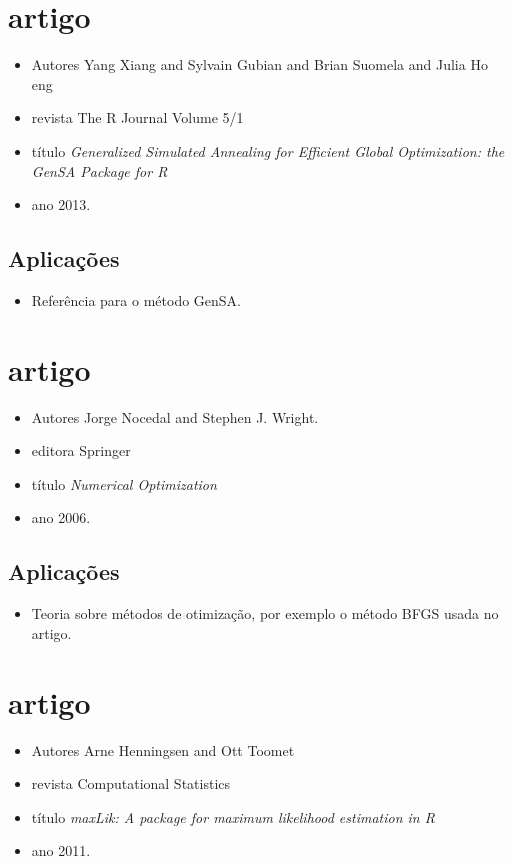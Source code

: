 \documentclass{article}
\begin{document}
\section{artigo \cite{xgsh}}
\begin{itemize}
\item Autores Yang Xiang and Sylvain Gubian and Brian Suomela and
      Julia Ho eng
\item revista The R Journal Volume 5/1
\item título \textit{Generalized Simulated Annealing for Efficient Global
      Optimization: the {GenSA} Package for {R}}
\item ano 2013.
\end{itemize}
\subsection{Aplicações}
\begin{itemize}
\item Referência para o método GenSA.
\end{itemize}
\section{artigo \cite{nw}}
\begin{itemize}
\item Autores Jorge Nocedal and Stephen J. Wright.
\item editora Springer
\item título \textit{Numerical Optimization}
\item ano 2006.
\end{itemize}
\subsection{Aplicações}
\begin{itemize}
\item Teoria sobre métodos de otimização, por exemplo o método BFGS usada no artigo.
\end{itemize}
\section{artigo \cite{ht}}
\begin{itemize}
\item Autores Arne Henningsen and Ott Toomet
\item revista Computational Statistics
\item título \textit{maxLik: A package for maximum likelihood estimation in
      {R}}
\item ano 2011.
\end{itemize}
\end{document}
